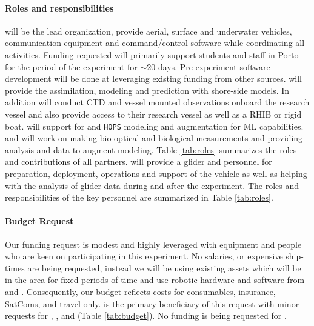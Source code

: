 \paragraph{Roles and responsibilities} \univ will be the lead
organization, provide aerial, surface and underwater vehicles,
communication equipment and command/control software while
coordinating all activities. Funding requested will primarily support
students and staff in Porto for the period of the experiment for
$\sim 20$ days. Pre-experiment software development will be done at
\univ leveraging existing funding from other sources. \inst will
provide the assimilation, modeling and prediction with shore-side
models. In addition \inst will conduct CTD and vessel mounted
observations onboard the research vessel and also provide access to
their research vessel as well as a RHIB or rigid boat. \mit will
support \inst for \mse and \texttt{HOPS} modeling and augmentation for
ML capabilities. \colo and \ave will work on making bio-optical and
biological measurements and providing analysis and data to augment
\inst modeling. Table \ref{tab:roles} summarizes the roles and
contributions of all partners. \soc will provide a glider and
personnel for preparation, deployment, operations and support of the
vehicle as well as helping with the analysis of glider data during and
after the experiment. The roles and responsibilities of the key
personnel are summarized in Table \ref{tab:roles}.


\paragraph{Budget Request} Our funding request is modest and highly
leveraged with equipment and people who are keen on participating in
this experiment. No salaries, or expensive ship-times are being
requested, instead we will be using existing assets which will be in
the \naz area for fixed periods of time and use robotic hardware and
software from \univ and \soce. Consequently, our budget reflects costs
for consumables, insurance, SatComs, and travel only. \univ is the
primary beneficiary of this request with minor requests for \inste,
\avee, \colo and \soc (Table \ref{tab:budget}). No funding is being
requested for \mite.

